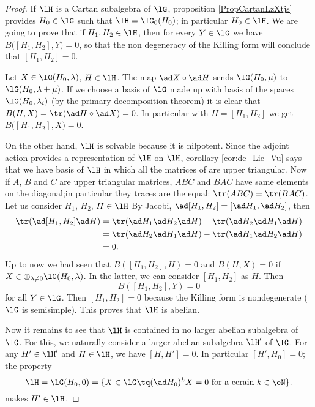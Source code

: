 \begin{proof}
    If \( \lH\) is a Cartan subalgebra of \( \lG\), proposition \ref{PropCartanLzXtjs} provides \( H_0\in\lG\) such that \( \lH=\lG_0(H_0)\); in particular \( H_0\in\lH\). We are going to prove that if \( H_1,H_2\in\lH\), then for every \( Y\in\lG\) we have \( B\big( [H_1,H_2],Y \big)=0\), so that the non degeneracy of the Killing form will conclude that \( [H_1,H_2]=0\).

    
    Let $X\in\lG(H_0,\lambda)$, $H\in\lH$. The map $\ad X\circ\ad H$ sends $\lG(H_0,\mu)$ to $\lG(H_0,\lambda+\mu)$. If we choose a basis of $\lG$ made up with basis of the spaces $\lG(H_0,\lambda_i)$ (by the primary decomposition theorem) it is clear that $B(H,X)=\tr(\ad H\circ\ad X)=0$. In particular with \( H=[H_1,H_2]\) we get \( B\big( [H_1,H_2],X \big)=0\).

    On the other hand, $\lH$ is solvable because it is nilpotent. Since the adjoint action provides a representation of \( \lH\) on \( \lH\), corollary \ref{cor:de_Lie_Vu} says that we have  basis of $\lH$ in which all the matrices of are upper triangular. Now if $A$, $B$ and $C$ are upper triangular matrices, $ABC$ and $BAC$ have same elements on the diagonal;in particular they traces are the equal: $\tr(ABC)=\tr(BAC)$. Let us consider $H_1$, $H_2$, $H\in\lH$ By Jacobi, $\ad[H_1,H_2]=[\ad H_1,\ad H_2]$, then
    \begin{equation}
    \begin{split}
    \tr(\ad[H_1,H_2]\ad H)&=\tr(\ad H_1\ad H_2\ad H)-\tr(\ad H_2\ad H_1\ad H)\\
    &=\tr(\ad H_2\ad H_1\ad H)-\tr(\ad H_1\ad H_2\ad H)\\
    &=0.
    \end{split}
    \end{equation}
    Up to now we had seen that $B([H_1,H_2],H)=0$ and $B(H,X)=0$ if $X\in\oplus_{\lambda\neq 0}\lG(H_0,\lambda)$. In the latter, we can consider $[H_1,H_2]$ as $H$. Then 
    \[
    B([H_1,H_2],Y)=0
    \]
    for all $Y\in\lG$. Then $[H_1,H_2]=0$ because the Killing form is nondegenerate ($\lG$ is semisimple). This proves that $\lH$ is abelian.

    Now it remains to see that $\lH$ is contained in no larger abelian subalgebra of $\lG$. For this, we naturally consider a larger abelian subalgebra $\lH'$ of $\lG$. For any $H'\in\lH'$ and $H\in\lH$, we have $[H,H']=0$. In particular $[H',H_0]=0$; the property 
    \[
    \lH=\lG(H_0,0)=\{X\in\lG\tq (\ad H_0)^kX=0\text{ for a cerain $k\in\eN$}\}.
    \]
    makes $H'\in\lH$.
\end{proof}


